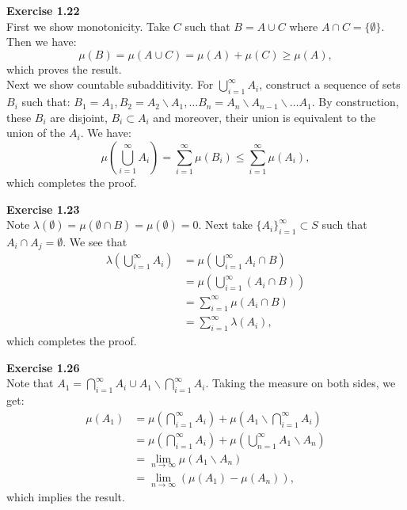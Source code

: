 \documentclass[UTF8]{article}
\begin{document}
\medskip
\noindent \textbf{Exercise 1.22} \\
First we show monotonicity. Take $C$ such that $B = A \cup C$ where $A \cap C = \{\emptyset\}$. Then we have:
$$\mu(B) = \mu(A \cup C) = \mu(A) + \mu(C) \geq \mu(A),$$
which proves the result. \\
Next we show countable subadditivity. For $\bigcup\limits_{i=1}^{\infty} A_i$, construct a sequence of sets $B_i$ such that: $B_1 = A_1, B_2 = A_2 \backslash A_1, \dots B_n = A_n \backslash A_{n-1}  \backslash  \dots A_1$. By construction, these $B_i$ are disjoint, $B_i \subset A_i$ and moreover, their union is equivalent to the union of the $A_i$. We have:
$$ \mu(\bigcup\limits_{i=1}^{\infty} A_i) = \sum\limits_{i=1}^{\infty} \mu(B_i) \leq \sum\limits_{i=1}^{\infty} \mu(A_i),$$ which completes the proof.

\medskip
\noindent \textbf{Exercise 1.23} \\ 

Note $\lambda(\emptyset) = \mu(\emptyset \cap B) = \mu(\emptyset) = 0.$ Next take $\{A_i\}_{i=1}^\infty \subset S$ such that $A_i \cap A_j = \emptyset$. 
We see that
\begin{align*}
\lambda(\bigcup\limits_{i=1}^{\infty} A_i) &= \mu(\bigcup\limits_{i=1}^{\infty} A_i \cap B) \\
&= \mu(\bigcup\limits_{i=1}^{\infty}(A_i \cap B)) \\
&= \sum\limits_{i=1}^{\infty} \mu(A_i \cap B) \\
&= \sum\limits_{i=1}^{\infty} \lambda(A_i ),
\end{align*}
which completes the proof.

\medskip
\noindent \textbf{Exercise 1.26} \\ 

Note that $A_1 = \bigcap\limits_{i=1}^{\infty} A_i \cup A_1 \backslash \bigcap\limits_{i=1}^{\infty} A_i$. Taking the measure on both sides, we get:
\begin{align*}
\mu (A_1) &= \mu (\bigcap\limits_{i=1}^{\infty} A_i) +  \mu (A_1 \backslash \bigcap\limits_{i=1}^{\infty} A_i) \\
&= \mu(\bigcap\limits_{i=1}^{\infty} A_i) + \mu(\bigcup\limits_{n=1}^{\infty} A_1 \backslash A_n)  \\
&= \lim\limits_{n \to \infty} \mu(A_1 \backslash A_n) \\
&= \lim\limits_{n \to \infty} (\mu(A_1) - \mu(A_n)),
\end{align*}
which implies the result.
\end{document}
